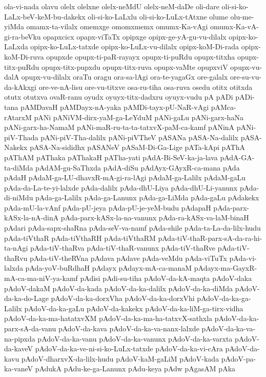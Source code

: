 {ola-vi-nada
olavu
olelx
olelxne
olelx-neMdU
olelx-neM-daDe
oli-dare
oli-si-ko-LaLx-beV-keM-bu-dakekx
oli-si-ko-LaLxlu
oli-si-ko-LuLx-tAtxne
olume
olu-me-yiMda
omamx-ta-vilalx
omemxge
omomxmemx
omumx-Ka-vAgi
omumx-Ka-vA-gi-ra-beVku
opapxcicx
opapx-viTaTx
opipxge
opipx-ge-yA-gu-vu-dilalx
opipx-ko-LaLxda
opipx-ko-LuLx-tatxde
opipx-ko-LuLx-vu-dilalx
opipx-koM-Di-rada
opipx-koM-Di-ruva
opupxde
opupx-ti-paR-rayayx
opupx-ti-puRdu
opupx-titxha
opupx-titx-puRdu
opupx-titx-pupxdu
opupx-titx-ruva
opupx-vaMte
opupxviV
opupx-vu-dalA
opupx-vu-dilalx
oraTu
oragu
ora-sa-lAgi
ora-te-yagaGx
ore-galalx
ore-su-vu-da-kAkxgi
ore-ve-nA-lisu
ore-vu-titxve
osa-ru-tiha
osa-ruva
osedu
otitx
otitxda
otutx
otutxva
ovaR-ranu
oyudx
oyuyx-titx-dadxru
oyuyx-vudu
pA
pADi
pADi-tana
pAMDavaH
pAMDayx-nA-yaka
pAMDi-tayx-pU-NaR-vAgi
pAMca-rAtarxM
pANi
pANiVM-dirx-yaM-ga-LeYduM
pANi-gaLu
pANi-garx-haNa
pANi-garx-ha-NamaM
pANi-maR-ru-ta-ta-tatxvX-paM-ca-kamf
pANinA
pANi-piV-Thada
pANi-piV-Tha-dalilx
pANi-piVTheV
pASANa
pASA-Na-dalilx
pASA-Nakekx
pASA-Na-sididhx
pASANeV
pASaM-Di-Ga-Lige
pATa-kApi
pAThA
pAThAM
pAThaka
pAThakaH
pATha-yati
pAdA-Bi-SeV-ka-ja-lava
pAdA-GA-ta-diMda
pAdAM-gu-SaThxda
pAdA-diSu
pAdAyx-GAyxR-ca-mana
pAda
pAdaH
pAdaM-ga-LU-dhavxR-mA-gi-ra-lAgi
pAdaM-ga-Lalilx
pAdaM-gaLu
pAda-da-La-te-yi-lalxde
pAda-dalilx
pAda-dhU-Liya
pAda-dhU-Li-yanunx
pAda-di-niMdu
pAda-ga-Lalilx
pAda-ga-Lanunx
pAda-ga-LiMda
pAda-gaLu
pAdakekx
pAda-mU-la-vAnf
pAda-pU-jeya
pAda-pU-je-yeM-budu
pAdapaH
pAda-parx-kASx-la-nA-dinA
pAda-parx-kASx-la-na-vanunx
pAda-ra-kASx-va-laM-binaH
pAdari
pAda-sapx-shaRna
pAda-seV-va-namf
pAda-shile
pAda-ta-La-da-lilx-hudu
pAda-tiVthaR
pAda-tiVthaRH
pAda-tiVthaRM
pAda-tiV-thaR-parx-sA-da-ra-hi-ta-nAgi
pAda-tiV-thaRva
pAda-tiV-thaR-vanunx
pAda-tiV-thaRve
pAda-tiV-thaRvu
pAda-tiV-theRVna
pAdava
pAdave
pAda-veMdu
pAda-viTuTx
pAda-vi-lalxda
pAda-yoV-buRdhaH
pAdayx
pAdayx-mA-ca-manaM
pAdayx-ma-GayxR-mA-ca-ma-niV-ya-kamf
pAdisi
pAdi-su-tiha
pAdoV-da-kA-maqta
pAdoV-daka
pAdoV-dakaM
pAdoV-da-kada
pAdoV-da-ka-dalilx
pAdoV-da-ka-diMda
pAdoV-da-ka-do-Lage
pAdoV-da-ka-dorxVha
pAdoV-da-ka-dorxVhi
pAdoV-da-ka-ga-Lalilx
pAdoV-da-ka-gaLu
pAdoV-da-kakekx
pAdoV-da-ka-liM-ga-tirx-vidha
pAdoV-da-ka-ma-hatatxvXM
pAdoV-da-ka-ma-ha-tatxvX-sathxla
pAdoV-da-ka-parx-sA-da-vanu
pAdoV-da-kava
pAdoV-da-ka-va-nanx-lalxde
pAdoV-da-ka-va-na-pipxda
pAdoV-da-ka-vanu
pAdoV-da-ka-vanunx
pAdoV-da-ka-varxta
pAdoV-da-kaveV
pAdoV-da-ka-ve-ni-si-ko-LuLx-tatxde
pAdoV-da-ka-vi-cAra
pAdoV-da-kavu
pAdoV-dharxvX-da-lilx-hudu
pAdoV-kaM-gaLiM
pAdoV-kada
pAdoV-pa-ka-vaneV
pAdukA
pAdu-ke-ga-Lanunx
pAdu-keya
pAdw
pAgasAM
pAka
}
